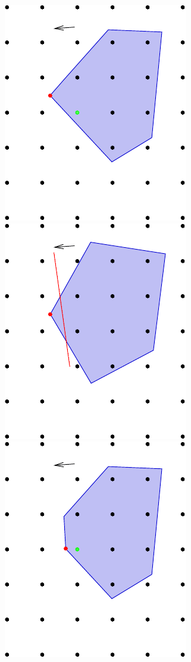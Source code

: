 \begin{figure}[H]
\includegraphics[scale = 0.4]{optimization/figures/figures-static/figureCutttingPlane1.pdf} 
\hspace{0.3cm}
\includegraphics[scale = 0.4]{optimization/figures/figures-static/figureCutttingPlane2}
\hspace{0.3cm}
\includegraphics[scale = 0.4]{optimization/figures/figures-static/figureCutttingPlane3}

\end{figure}
